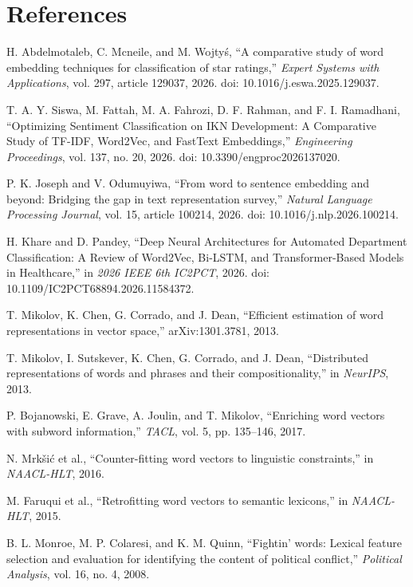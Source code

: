 \documentclass[11pt,a4paper]{article}
\begin{document}
\section*{References}
\begin{enumerate}[label={[\arabic*]},leftmargin=*,itemsep=1pt]\small
\item H. Abdelmotaleb, C. Mcneile, and M. Wojty\'{s}, ``A comparative study of word embedding techniques for classification of star ratings,'' \textit{Expert Systems with Applications}, vol. 297, article 129037, 2026. doi: 10.1016/j.eswa.2025.129037.
\item T. A. Y. Siswa, M. Fattah, M. A. Fahrozi, D. F. Rahman, and F. I. Ramadhani, ``Optimizing Sentiment Classification on IKN Development: A Comparative Study of TF-IDF, Word2Vec, and FastText Embeddings,'' \textit{Engineering Proceedings}, vol. 137, no. 20, 2026. doi: 10.3390/engproc2026137020.
\item P. K. Joseph and V. Odumuyiwa, ``From word to sentence embedding and beyond: Bridging the gap in text representation survey,'' \textit{Natural Language Processing Journal}, vol. 15, article 100214, 2026. doi: 10.1016/j.nlp.2026.100214.
\item H. Khare and D. Pandey, ``Deep Neural Architectures for Automated Department Classification: A Review of Word2Vec, Bi-LSTM, and Transformer-Based Models in Healthcare,'' in \textit{2026 IEEE 6th IC2PCT}, 2026. doi: 10.1109/IC2PCT68894.2026.11584372.
\item T. Mikolov, K. Chen, G. Corrado, and J. Dean, ``Efficient estimation of word representations in vector space,'' arXiv:1301.3781, 2013.
\item T. Mikolov, I. Sutskever, K. Chen, G. Corrado, and J. Dean, ``Distributed representations of words and phrases and their compositionality,'' in \textit{NeurIPS}, 2013.
\item P. Bojanowski, E. Grave, A. Joulin, and T. Mikolov, ``Enriching word vectors with subword information,'' \textit{TACL}, vol. 5, pp. 135--146, 2017.
\item N. Mrk\v{s}i\'{c} et al., ``Counter-fitting word vectors to linguistic constraints,'' in \textit{NAACL-HLT}, 2016.
\item M. Faruqui et al., ``Retrofitting word vectors to semantic lexicons,'' in \textit{NAACL-HLT}, 2015.
\item B. L. Monroe, M. P. Colaresi, and K. M. Quinn, ``Fightin' words: Lexical feature selection and evaluation for identifying the content of political conflict,'' \textit{Political Analysis}, vol. 16, no. 4, 2008.

\end{enumerate}
\end{document}
